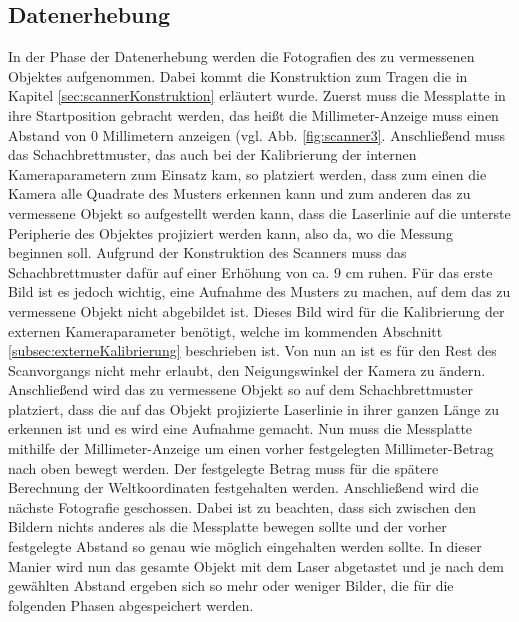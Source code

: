 \subsection{Datenerhebung}
In der Phase der Datenerhebung werden die Fotografien des zu vermessenen Objektes aufgenommen. Dabei kommt die Konstruktion zum Tragen die in Kapitel \ref{sec:scannerKonstruktion} erläutert wurde. Zuerst muss die Messplatte in ihre Startposition gebracht werden, das heißt die Millimeter-Anzeige muss einen Abstand von 0 Millimetern anzeigen (vgl. Abb. \ref{fig:scanner3}. Anschließend muss das Schachbrettmuster, das auch bei der Kalibrierung der internen Kameraparametern zum Einsatz kam, so platziert werden, dass zum einen die Kamera alle Quadrate des Musters erkennen kann und zum anderen das zu vermessene Objekt so aufgestellt werden kann, dass die Laserlinie auf die unterste Peripherie des Objektes projiziert werden kann, also da, wo die Messung beginnen soll. Aufgrund der Konstruktion des Scanners muss das Schachbrettmuster dafür auf einer Erhöhung von ca. 9 cm ruhen. Für das erste Bild ist es jedoch wichtig, eine Aufnahme des Musters zu machen, auf dem das zu vermessene Objekt nicht abgebildet ist. Dieses Bild wird für die Kalibrierung der externen Kameraparameter benötigt, welche im kommenden Abschnitt \ref{subsec:externeKalibrierung} beschrieben ist. Von nun an ist es für den Rest des Scanvorgangs nicht mehr erlaubt, den Neigungswinkel der Kamera zu ändern.
Anschließend wird das zu vermessene Objekt so auf dem Schachbrettmuster platziert, dass die auf das Objekt projizierte Laserlinie in ihrer ganzen Länge zu erkennen ist und es wird eine Aufnahme gemacht. Nun muss die Messplatte mithilfe der Millimeter-Anzeige um einen vorher festgelegten Millimeter-Betrag nach oben bewegt werden. Der festgelegte Betrag muss für die spätere Berechnung der Weltkoordinaten festgehalten werden. Anschließend wird die nächste Fotografie geschossen. Dabei ist zu beachten, dass sich zwischen den Bildern nichts anderes als die Messplatte bewegen sollte und der vorher festgelegte Abstand so genau wie möglich eingehalten werden sollte. In dieser Manier wird nun das gesamte Objekt mit dem Laser abgetastet und je nach dem gewählten Abstand ergeben sich so mehr oder weniger Bilder, die für die folgenden Phasen abgespeichert werden.      

